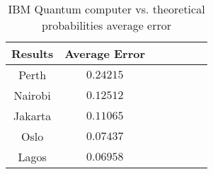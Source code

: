 \begin{table}[!ht]
    \centering
    {\renewcommand{\arraystretch}{1.2}%
    \begin{tabular}{c|cccccc}
    \hline
        Results & Average Error \\ \hline
        Perth & $\scriptstyle0.24215$  \\ 
        Nairobi & $\scriptstyle0.12512$  \\ 
        Jakarta & $\scriptstyle0.11065$  \\ 
        Oslo & $\scriptstyle0.07437$  \\ 
        Lagos & $\scriptstyle0.06958$ \\ \hline
    \end{tabular}}
    \caption{IBM Quantum computer vs. theoretical probabilities average error}
\end{table}
